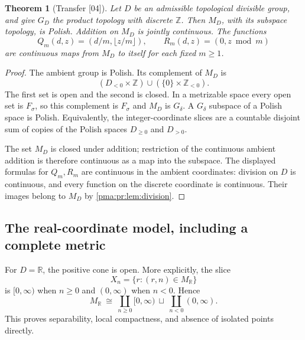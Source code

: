 \documentclass[11pt]{article}
\numberwithin{equation}{section}
\newtheorem{theorem}{Theorem}[section]
\theoremstyle{definition}
\theoremstyle{remark}
\newcommand{\Z}{\mathbb Z}
\newcommand{\R}{\mathbb R}
\newcommand{\MR}{M_{\R}}
\newcommand{\src}[1]{\textup{\textsf{\small[#1]}}}
\begin{document}
\begin{theorem}[Transfer \src{04}]\label{pma:pr:thm:transfer}
Let $D$ be an admissible topological divisible group, and give $G_D$ the
product topology with discrete $\Z$. Then $M_D$, with its subspace
topology, is Polish. Addition on $M_D$ is jointly continuous. The functions
\[
 Q_m(d,z)=\left(d/m,\lfloor z/m\rfloor\right),\qquad
 R_m(d,z)=(0,z\bmod m)
\]
are continuous maps from $M_D$ to itself for each fixed $m\geq1$.
\end{theorem}

\begin{proof}
The ambient group is Polish. Its complement of $M_D$ is
\[
 (D_{<0}\times\Z)\cup(\{0\}\times\Z_{<0}).
\]
The first set is open and the second is closed. In a metrizable space every
open set is $F_\sigma$, so this complement is $F_\sigma$ and $M_D$ is
$G_\delta$. A $G_\delta$ subspace of a Polish space is Polish. Equivalently,
the integer-coordinate slices are a countable disjoint sum of copies of
the Polish spaces $D_{\geq0}$ and $D_{>0}$.

The set $M_D$ is closed under addition; restriction of the continuous
ambient addition is therefore continuous as a map into the subspace.
The displayed formulas for $Q_m,R_m$ are continuous in the ambient
coordinates: division on $D$ is continuous, and every function on the
discrete coordinate is continuous. Their images belong to $M_D$ by
\cref{pma:pr:lem:division}.
\end{proof}

\subsection{The real-coordinate model, including a complete metric}

For $D=\R$, the positive cone is open. More explicitly, the slice
\[
 X_n=\{r:(r,n)\in\MR\}
\]
is $[0,\infty)$ when $n\geq0$ and $(0,\infty)$ when $n<0$. Hence
\begin{equation}
 \MR\ \cong\
 \coprod_{n\geq0}[0,\infty)\ \sqcup\
 \coprod_{n<0}(0,\infty).
 \label{pma:pr:eq:rays}
\end{equation}
This proves separability, local compactness, and absence of isolated
points directly.
\end{document}
